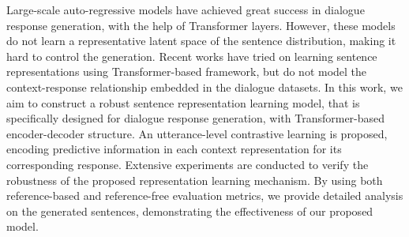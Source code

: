 Large-scale auto-regressive models have achieved great success in dialogue response generation, with the help of Transformer layers. However, these models do not learn a representative latent space of the sentence distribution, making it hard to control the generation. Recent works have tried on learning sentence representations using Transformer-based framework, but do not model the context-response relationship embedded in the dialogue datasets. In this work, we aim to construct a robust sentence representation learning model, that is specifically designed for dialogue response generation, with Transformer-based encoder-decoder structure. An utterance-level contrastive learning is proposed, encoding predictive information in each context representation for its corresponding response. Extensive experiments are conducted to verify the robustness of the proposed representation learning mechanism. By using both reference-based and reference-free evaluation metrics, we provide detailed analysis on the generated sentences, demonstrating the effectiveness of our proposed model.

